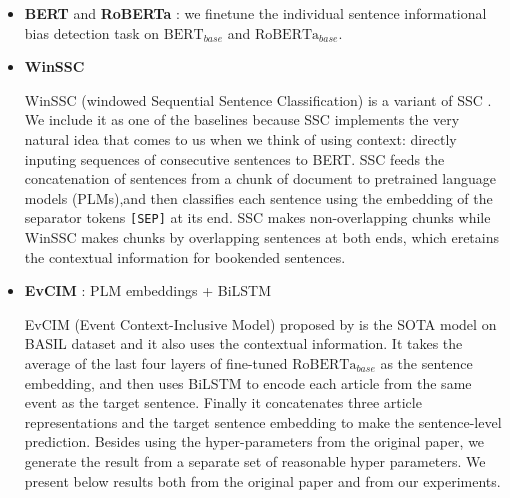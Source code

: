 \documentclass[letterpaper]{article} %
\begin{document}
\begin{itemize}
    \item \textbf{BERT} \citep{devlin-etal-2019-bert} and \textbf{RoBERTa} \citep{liu2019roberta}: we finetune the individual sentence informational bias detection task on $\text{BERT}_{base}$ and $\text{RoBERTa}_{base}$.
    \item \textbf{WinSSC} \citep{van-den-berg-markert-2020-context}
        
        WinSSC (windowed Sequential Sentence Classification) is a variant of SSC \citep{cohan-etal-2019-pretrained}. We include it as one of the baselines because SSC implements the very natural idea that comes to us when we think of using context: directly inputing sequences of consecutive sentences to BERT. SSC feeds the concatenation of sentences from a chunk of document to pretrained language models (PLMs),and  then classifies each sentence using the embedding of the separator tokens \texttt{[SEP]} at its end. SSC makes non-overlapping chunks while WinSSC makes chunks by overlapping sentences at both ends, which eretains the contextual information for bookended sentences. 
        
    \item \textbf{EvCIM}\label{para:evcim}  : PLM embeddings + BiLSTM
    
        EvCIM (Event Context-Inclusive Model) proposed by \citet{cohan-etal-2019-pretrained} is the SOTA model on BASIL dataset and it also uses the contextual information.
         It takes the average of the last four layers of fine-tuned $\text{RoBERTa}_{base}$ as the sentence embedding, and then uses BiLSTM to encode each article from the same event as the target sentence. Finally it concatenates three article representations and the target sentence embedding to make the sentence-level prediction. Besides using the hyper-parameters from the original paper, we generate the result from a separate set of reasonable hyper parameters. We present below results both from the original paper and from our experiments.
    
\end{itemize}
\end{document}
